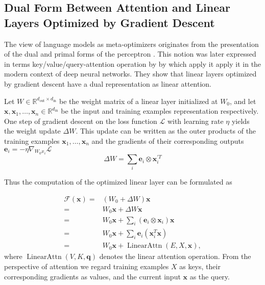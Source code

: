 \subsection{Dual Form Between Attention and Linear Layers Optimized by Gradient Descent}

The view of language models as meta-optimizers originates from the presentation of the dual and primal forms of the perceptron \cite{Aizerman2019TheoreticalFO}.
This notion was later expressed in terms key/value/query-attention operation by by \cite{irie22dual,dai2023gpt,pmlr-v202-von-oswald23a} which apply it apply it in the modern context of deep neural networks.
They show that linear layers optimized by gradient descent have a dual representation as linear attention.

Let $W \in \mathbb{R}^{d_{\text{out}} \times d_{\text{in}}}$ be the weight matrix of a linear layer initialized at $W_0$, and let $\mathbf{x}, \mathbf{x}_1, \dots, \mathbf{x}_n  \in \mathbb{R}^{d_{\text{in}}}$ be the input and training examples representation respectively.
One step of gradient descent on the loss function $\mathcal{L}$ with learning rate $\eta$ yields the weight update $\Delta W$.
This update can be written as the outer products of the training examples $\mathbf{x}_1, \dots, \mathbf{x}_n$ and the gradients of their corresponding outputs $\mathbf{e}_i = -\eta \nabla_{W_0 x_i}\mathcal{L}$
\begin{equation}
    \Delta W = \sum_i \mathbf{e}_i \otimes \mathbf{x}^{\prime T}_i
    \label{equ:dual_comp_2}
\end{equation}

Thus the computation of the optimized linear layer can be formulated as 

\begin{equation}
    \begin{aligned}
        \mathcal{F}(\mathbf{x}) = & \left( W_{0} + \Delta W \right) \mathbf{x} \\
        = & W_{0} \mathbf{x} + \Delta W \mathbf{x} \\
        = & W_{0} \mathbf{x} + \sum_i \left( \mathbf{e}_i \otimes \mathbf{x}_i\right) \mathbf{x} \\
        = & W_{0} \mathbf{x} + \sum_i \mathbf{e}_i \left( \mathbf{x}^{T}_i \mathbf{x} \right) \\
        = & W_{0} \mathbf{x} + \operatorname{LinearAttn} \left( E, X, \mathbf{x} \right), 
    \end{aligned}
    \label{equ:sgd_attn_dual}
\end{equation}
where $\operatorname{LinearAttn}(V, K, \mathbf{q})$ denotes the linear attention operation.
From the perspective of attention we regard training examples $X$ as keys, their corresponding gradients as values, and the current input $\mathbf{x}$ as the query.


